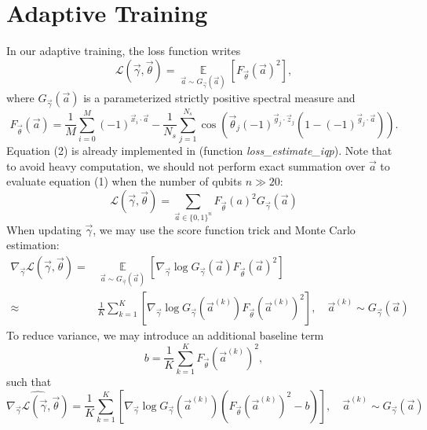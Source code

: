 \documentclass[a4paper,onecolumn,notitlepage,nofootinbib,longbibliography,superscriptaddress, floatfix, pra, aps, 10pt]{revtex4-2}
\begin{document}
\section{Adaptive Training}
In our adaptive training, the loss function writes
\begin{equation}
\mathcal{L}(\vec\gamma, \vec\theta) =\mathop{\mathbb{E}}\limits_{\vec{a} \sim G_{\vec{\gamma}}(\vec{a})} \left[ F_{\vec{\theta}}(\vec{a})^2 \right],
\end{equation} where $G_{\vec{\gamma}}(\vec{a})$ is a parameterized strictly positive spectral measure and \begin{equation}F_{\vec{\theta}}(\vec{a}) = \frac{1}{M} \sum_{i=0}^{M} (-1)^{\vec{x}_i \cdot \vec{a}} - \frac{1}{N_s} \sum_{j=1}^{N_s}\cos \left( \vec{\theta}_j (-1)^{\vec{g}_j \cdot \vec{z}_j} (1- (-1)^{\vec{g}_j \cdot \vec{a}})\right). \end{equation}
Equation (2) is already implemented in \cite{recioarmengol2025iqpoptfastoptimizationinstantaneous} (function \textit{loss\_estimate\_iqp}). Note that to avoid heavy computation, we should not perform exact summation over $\vec{a}$ to evaluate equation (1) when the number of qubits $n \gg 20$:
\begin{equation}
\mathcal{L}(\vec\gamma, \vec\theta) = \sum_{\vec{a}\in \{0,1\}^n} F_{\vec{\theta}}(a)^2 G_{\vec{\gamma}}(\vec{a})
\end{equation}
When updating $\vec{\gamma}$, we may use the score function trick and Monte Carlo estimation:
\begin{align}
\nabla_{\vec{{\gamma}}}\mathcal{L}(\vec\gamma, \vec\theta) =& \mathop{\mathbb{E}}\limits_{\vec{a} \sim G_{\vec{\gamma}}(\vec{a})} \left[ \nabla_{\vec{\gamma}} \log G_{\vec{\gamma}}(\vec{a}) F_{\vec{\theta}}(\vec{a})^2 \right] \\
\approx& \frac{1}{K}\sum_{k=1}^{K} \left[ \nabla_{\vec{\gamma}} \log G_{\vec{\gamma}}(\vec{a}^{(k)}) F_{\vec{\theta}}(\vec{a}^{(k)})^2 \right], \quad \vec{a}^{(k)} \sim G_{\vec{\gamma}}(\vec{a})
\end{align}
To reduce variance, we may introduce an additional baseline term 
\begin{equation}
b= \frac{1}{K}\sum_{k=1}^{K} F_{\vec{\theta}}(\vec{a}^{(k)})^2,
\end{equation} such that \begin{equation}
\widehat{\nabla_{\vec{{\gamma}}}\mathcal{L}(\vec\gamma, \vec\theta)} = \frac{1}{K}\sum_{k=1}^{K} \left[ \nabla_{\vec{\gamma}} \log G_{\vec{\gamma}}(\vec{a}^{(k)}) (F_{\vec{\theta}}(\vec{a}^{(k)})^2 - b )\right], \quad \vec{a}^{(k)} \sim G_{\vec{\gamma}}(\vec{a})
\end{equation}
\end{document}
